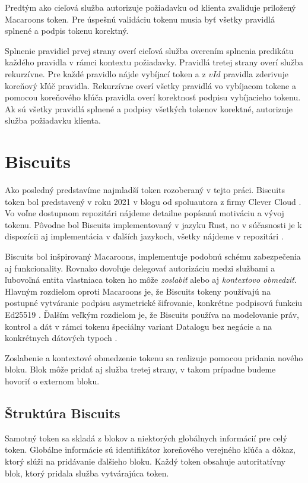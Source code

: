 Predtým ako cieľová služba autorizuje požiadavku od klienta zvaliduje priložený Macaroons token. Pre úspešnú validáciu tokenu musia byť všetky pravidlá splnené a podpis tokenu korektný.

Splnenie pravidiel prvej strany overí cieľová služba overením splnenia predikátu každého pravidla v rámci kontextu požiadavky. Pravidlá tretej strany overí služba rekurzívne. Pre každé pravidlo nájde vybíjací token a z $vId$ pravidla zderivuje koreňový kľúč pravidla. Rekurzívne overí všetky pravidlá vo vybíjacom tokene a pomocou koreňového kľúča pravidla overí korektnosť podpisu vybíjacieho tokenu. Ak sú všetky pravidlá splnené a podpisy všetkých tokenov korektné, autorizuje služba požiadavku klienta.

\section{Biscuits}

Ako posledný predstavíme najmladší token rozoberaný v tejto práci. Biscuits token bol predstavený v roku 2021 v blogu od spoluautora z firmy Clever Cloud \cite{biscuits_blog}. Vo voľne dostupnom repozitári \cite{biscuits_git} nájdeme detailne popísanú motiváciu a vývoj tokenu. Pôvodne bol Biscuits implementovaný v jazyku Rust, no v súčasnosti je k dispozícii aj implementácia v ďalších jazykoch, všetky nájdeme v repozitári \cite{biscuits_git}.

Biscuits bol inšpirovaný Macaroons, implementuje podobnú schému zabezpečenia aj funkcionality. Rovnako dovoľuje delegovať autorizáciu medzi službami a ľubovoľná entita vlastniaca token ho môže \textit{zoslabiť} alebo aj \textit{kontextovo obmedziť}. Hlavným rozdielom oproti Macaroons je, že Biscuits tokeny používajú na postupné vytváranie podpisu asymetrické šifrovanie, konkrétne podpisovú funkciu Ed25519 \cite{ed_rfc}. Ďalším veľkým rozdielom je, že Biscuits používa na modelovanie práv, kontrol a dát v rámci tokenu špeciálny variant Datalogu bez negácie a na konkrétnych dátových typoch \cite{datalog_bis}.

Zoslabenie a kontextové obmedzenie tokenu sa realizuje pomocou pridania nového bloku. Blok môže pridať aj služba tretej strany, v takom prípadne budeme hovoriť o externom bloku.

\subsection{Štruktúra Biscuits}

Samotný token sa skladá z blokov a niektorých globálnych informácií pre celý token. Globálne informácie sú identifikátor koreňového verejného kľúča a dôkaz, ktorý slúži na pridávanie ďalšieho bloku. Každý token obsahuje autoritatívny blok, ktorý pridala služba vytvárajúca token.

